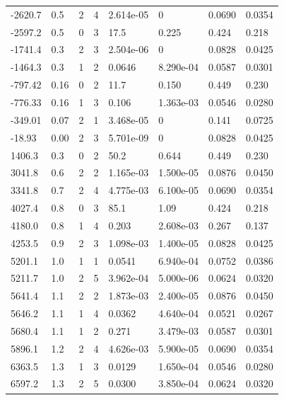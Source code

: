 \documentclass[preview]{standalone}
\begin{document}
{{\begin{tabular}{L{1.2cm}C{1.2cm} C{0.3cm}C{0.5cm} C{1.4cm}C{1.4cm} C{1.4cm}C{1.4cm}}
  -2620.7  &   0.5  & 2     &  4 &  2.614e-05  & 0  & 0.0690 &  0.0354   \\ 
  -2597.2  &   0.5  & 0     &  3 &  17.5  & 0.225  & 0.424 &  0.218   \\ 
  -1741.4  &   0.3  & 2     &  3 &  2.504e-06  & 0  & 0.0828 &  0.0425   \\ 
  -1464.3  &   0.3  & 1     &  2 &  0.0646  & 8.290e-04  & 0.0587 &  0.0301   \\ 
  -797.42  &  0.16  & 0     &  2 &  11.7  & 0.150  & 0.449 &  0.230   \\ 
  -776.33  &  0.16  & 1     &  3 &  0.106  & 1.363e-03  & 0.0546 &  0.0280   \\ 
  -349.01  &  0.07  & 2     &  1 &  3.468e-05  & 0  & 0.141 &  0.0725   \\ 
  -18.93  &  0.00  & 2     &  3 &  5.701e-09  & 0  & 0.0828 &  0.0425   \\ 
  1406.3  &   0.3  & 0     &  2 &  50.2  & 0.644  & 0.449 &  0.230   \\ 
  3041.8  &   0.6  & 2     &  2 &  1.165e-03  & 1.500e-05  & 0.0876 &  0.0450   \\ 
  3341.8  &   0.7  & 2     &  4 &  4.775e-03  & 6.100e-05  & 0.0690 &  0.0354   \\ 
  4027.4  &   0.8  & 0     &  3 &  85.1  & 1.09  & 0.424 &  0.218   \\ 
  4180.0  &   0.8  & 1     &  4 &  0.203  & 2.608e-03  & 0.267 &  0.137   \\ 
  4253.5  &   0.9  & 2     &  3 &  1.098e-03  & 1.400e-05  & 0.0828 &  0.0425   \\ 
  5201.1  &   1.0  & 1     &  1 &  0.0541  & 6.940e-04  & 0.0752 &  0.0386   \\ 
  5211.7  &   1.0  & 2     &  5 &  3.962e-04  & 5.000e-06  & 0.0624 &  0.0320   \\ 
  5641.4  &   1.1  & 2     &  2 &  1.873e-03  & 2.400e-05  & 0.0876 &  0.0450   \\ 
  5646.2  &   1.1  & 1     &  4 &  0.0362  & 4.640e-04  & 0.0521 &  0.0267   \\ 
  5680.4  &   1.1  & 1     &  2 &  0.271  & 3.479e-03  & 0.0587 &  0.0301   \\ 
  5896.1  &   1.2  & 2     &  4 &  4.626e-03  & 5.900e-05  & 0.0690 &  0.0354   \\ 
  6363.5  &   1.3  & 1     &  3 &  0.0129  & 1.650e-04  & 0.0546 &  0.0280   \\ 
  6597.2  &   1.3  & 2     &  5 &  0.0300  & 3.850e-04  & 0.0624 &  0.0320   \\ 

\end{tabular}}}
\end{document}
